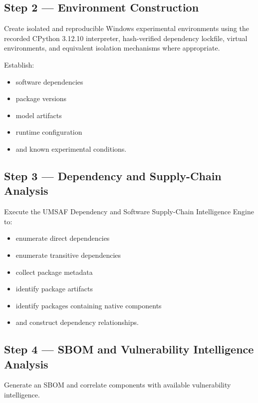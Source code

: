 \documentclass[
  12pt,
  letterpaper,
  oneside]{report}
\providecommand{\tightlist}{%
  \setlength{\itemsep}{0pt}\setlength{\parskip}{0pt}}
\begin{document}
\subsection{Step 2 --- Environment
Construction}\label{step-2--environment-construction}

Create isolated and reproducible Windows experimental environments using
the recorded CPython 3.12.10 interpreter, hash-verified dependency
lockfile, virtual environments, and equivalent isolation mechanisms
where appropriate.

Establish:

\begin{itemize}
\tightlist
\item
  software dependencies
\item
  package versions
\item
  model artifacts
\item
  runtime configuration
\item
  and known experimental conditions.
\end{itemize}

\subsection{Step 3 --- Dependency and Supply-Chain
Analysis}\label{step-3--dependency-and-supply-chain-analysis}

Execute the UMSAF Dependency and Software Supply-Chain Intelligence
Engine to:

\begin{itemize}
\tightlist
\item
  enumerate direct dependencies
\item
  enumerate transitive dependencies
\item
  collect package metadata
\item
  identify package artifacts
\item
  identify packages containing native components
\item
  and construct dependency relationships.
\end{itemize}

\subsection{Step 4 --- SBOM and Vulnerability Intelligence
Analysis}\label{step-4--sbom-and-vulnerability-intelligence-analysis}

Generate an SBOM and correlate components with available vulnerability
intelligence.
\end{document}
